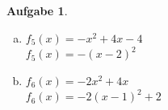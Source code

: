 \documentclass[12pt,fleqn]{article}
\theoremstyle{aufg}
\newtheorem{aufgabe}{Aufgabe}
\theoremstyle{bsp}
\begin{document}
\begin{flushleft}
\begin{aufgabe}
\begin{multicols}{3}
\begin{enumerate}[a)]
\item 
$f_5(x)=- x^{2} + 4 x - 4$ \\ 
$f_5(x)=- \left(x - 2\right)^{2}$ \\ 

\item 
$f_6(x)=- 2 x^{2} + 4 x$ \\ 
$f_6(x)=- 2 \left(x - 1\right)^{2} + 2$ \\ 

\end{enumerate} 
\end{multicols} 
\end{aufgabe} 
\end{flushleft} 
\end{document}
